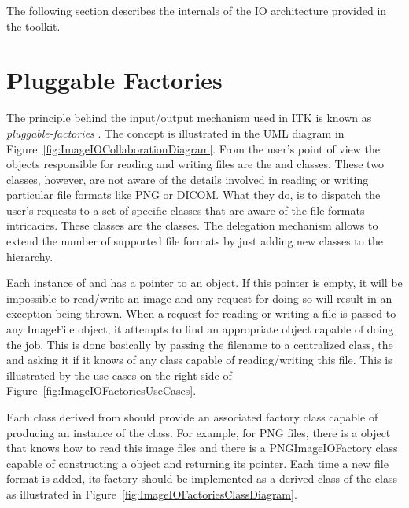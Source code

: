 The following section describes the internals of the IO architecture provided
in the toolkit.

\section{Pluggable Factories}
\label{sec:ImageIOPluggableFactories}

The principle behind the input/output mechanism used in ITK is known as
\emph{pluggable-factories} \cite{Gamma1995}. The concept is illustrated in the
UML diagram in Figure~\ref{fig:ImageIOCollaborationDiagram}. From the user's
point of view the objects responsible for reading and writing files are the
 and  classes. These two
classes, however, are not aware of the details involved in reading or writing
particular file formats like PNG or DICOM.  What they do, is to dispatch the
user's requests to a set of specific classes that are aware of the file formats
intricacies. These classes are the  classes. The delegation
mechanism allows to extend the number of supported file formats by just adding
new classes to the  hierarchy.

Each instance of  and 
has a pointer to an  object. If this pointer is empty, it will be
impossible to read/write an image and any request for doing so will result in
an exception being thrown. When a request for reading or writing a file is
passed to any ImageFile object, it attempts to find an appropriate
 object capable of doing the job. This is done basically by
passing the filename to a centralized class, the  and
asking it if it knows of any  class capable of reading/writing
this file. This is illustrated by the use cases on the right side of
Figure~\ref{fig:ImageIOFactoriesUseCases}.

Each class derived from  should provide an associated
factory class capable of producing an instance of the  class. For
example, for PNG files, there is a  object that knows how
to read this image files and there is a PNGImageIOFactory class capable of
constructing a  object and returning its pointer. Each time a
new file format is added, its factory should be implemented as a derived class
of the  class as illustrated in
Figure~\ref{fig:ImageIOFactoriesClassDiagram}. 

